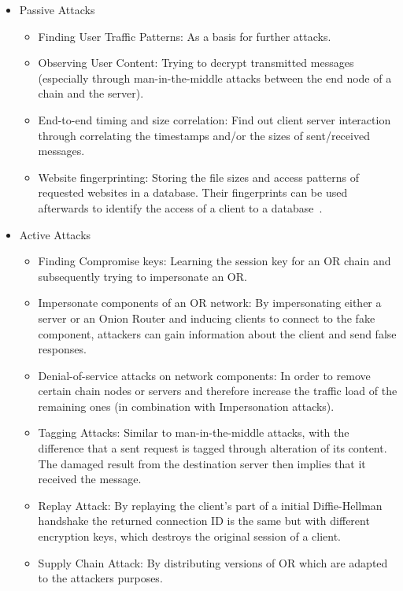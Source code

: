 \documentclass{sig-alternate}
\begin{document}
\begin{description} 
	\begin{itemize} \itemsep0pt 
		\item Passive Attacks
		\begin{itemize} \itemsep0pt 
			\item Finding User Traffic Patterns: As a basis for further attacks.
			\item Observing User Content: Trying to decrypt transmitted messages (especially through man-in-the-middle attacks between the end node of a chain and the server).
			\item End-to-end timing and size correlation: Find out client server interaction through correlating the timestamps and/or the sizes of sent/received messages.
			\item Website fingerprinting: Storing the file sizes and access patterns of requested websites in a database. Their fingerprints can be used afterwards to identify the access of a client to a database~\cite{panchenko2011website}.
		\end{itemize}
		\item Active Attacks
		\begin{itemize} \itemsep0pt 
			\item Finding Compromise keys: Learning the session key for an OR chain and subsequently trying to impersonate an OR.
			\item Impersonate components of an OR network: By impersonating either a server or an Onion Router and inducing clients to connect to the fake component, attackers can gain information about the client and send false responses.
			\item Denial-of-service attacks on network components: In order to remove certain chain nodes or servers and therefore increase the traffic load of the remaining ones (in combination with Impersonation attacks).
			\item Tagging Attacks: Similar to man-in-the-middle attacks, with the difference that a sent request is tagged through alteration of its content. The damaged result from the destination server then implies that it received the message. 
			\item Replay Attack: By replaying the client's part of a initial Diffie-Hellman handshake the returned connection ID is the same but with different encryption keys, which destroys the original session of a client.
			\item Supply Chain Attack: By distributing versions of OR which are adapted to the attackers purposes. 

\end{itemize}
\end{itemize}
\end{description}
\end{document}
